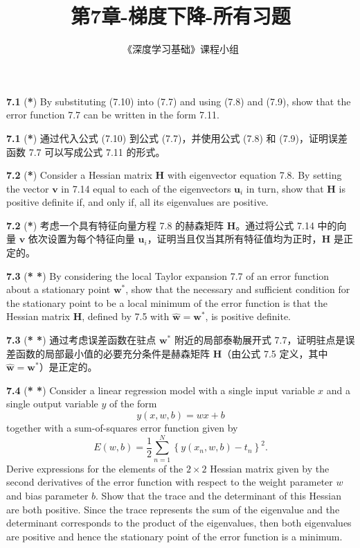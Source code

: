 \documentclass{article}
\title{第7章-梯度下降-所有习题}
\author{《深度学习基础》课程小组}
\begin{document}
\maketitle

\textbf{7.1} (\textbf{*}) By substituting (7.10) into (7.7) and using (7.8) and (7.9), show that the error function {7.7} can be written in the form {7.11}.

\textbf{7.1} (\textbf{*}) 通过代入公式 (7.10) 到公式 (7.7)，并使用公式 (7.8) 和 (7.9)，证明误差函数 {7.7} 可以写成公式 {7.11} 的形式。

\textbf{7.2} (\textbf{*}) Consider a Hessian matrix $\mathbf{H}$ with eigenvector equation {7.8}. By setting the vector $\mathbf{v}$ in {7.14} equal to each of the eigenvectors $\mathbf{u}_i$ in turn, show that $\mathbf{H}$ is positive definite if, and only if, all its eigenvalues are positive.

\textbf{7.2} (\textbf{*}) 考虑一个具有特征向量方程 {7.8} 的赫森矩阵 $\mathbf{H}$。通过将公式 {7.14} 中的向量 $\mathbf{v}$ 依次设置为每个特征向量 $\mathbf{u}_i$，证明当且仅当其所有特征值均为正时，$\mathbf{H}$ 是正定的。

\textbf{7.3} (\textbf{* *}) By considering the local Taylor expansion {7.7} of an error function about a stationary point $\mathbf{w}^*$, show that the necessary and sufficient condition for the stationary point to be a local minimum of the error function is that the Hessian matrix $\mathbf{H}$, defined by {7.5} with $\widehat{\mathbf{w}} = \mathbf{w}^*$, is positive definite.

\textbf{7.3} (\textbf{* *}) 通过考虑误差函数在驻点 $\mathbf{w}^*$ 附近的局部泰勒展开式 {7.7}，证明驻点是误差函数的局部最小值的必要充分条件是赫森矩阵 $\mathbf{H}$（由公式 {7.5} 定义，其中 $\widehat{\mathbf{w}} = \mathbf{w}^*$）是正定的。

\textbf{7.4} (\textbf{* *}) Consider a linear regression model with a single input variable $x$ and a single output variable $y$ of the form
\[
y(x, w, b) = wx + b
\]
together with a sum-of-squares error function given by
\[
E(w, b) = \frac{1}{2} \sum_{n=1}^{N} \left\{ y(x_n, w, b) - t_n \right\}^2.
\]
Derive expressions for the elements of the $2 \times 2$ Hessian matrix given by the second derivatives of the error function with respect to the weight parameter $w$ and bias parameter $b$. Show that the trace and the determinant of this Hessian are both positive. Since the trace represents the sum of the eigenvalue and the determinant corresponds to the product of the eigenvalues, then both eigenvalues are positive and hence the stationary point of the error function is a minimum.
\end{document}
